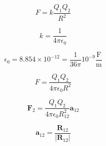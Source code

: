 \documentclass[fontsize=8pt]{scrartcl}
\begin{document}
  \begin{multicols}{3}

    \begin{equation}
      \tag{*}
      F = k\frac{Q_1 Q_2}{R^2}
      \label{eqn:coulumb_simple}
    \end{equation}

    \begin{equation}
      \tag{*}
      k = \frac{1}{4\pi\epsilon_0}
      \label{eqn:coulomb_k}
    \end{equation}

    \begin{equation}
      \tag{Permitividad del espacio libre}
      \epsilon_0 = 8.854 \times 10^{-12} = \frac{1}{36\pi}10^{-9} \frac{\text{F}}{\text{m}}
      \label{eqn:permitividad_espacio_libre}
    \end{equation}

    \begin{equation}
      \tag{Ley de Coulumb Escalar}
      F=\frac{Q_1 Q_2}{4\pi\epsilon_0 R^2}
      \label{eqn:coulumb_escalar}
    \end{equation}

    \begin{equation}
      \tag{Ley de Coulumb Vectorial}
      \pmb{\text{F}}_2=\frac{Q_1 Q_2}{4\pi\epsilon_0 R^2_{12}} \pmb{\text{a}}_{12}
      \label{eqn:coulumb_vectorial}
    \end{equation}

    \begin{equation}
      \tag{Dirección entre 1 y 2}
      \pmb{\text{a}}_{12}=\frac{\pmb{\text{R}}_{12}}{\left|\pmb{\text{R}}_{12}\right|}
      \label{eqn:eps0}
    \end{equation}

  \end{multicols}
\end{document}
